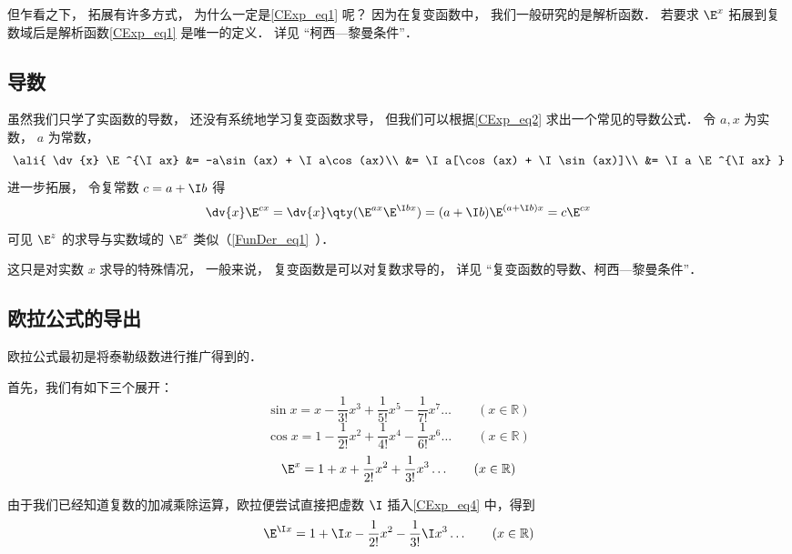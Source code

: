 但乍看之下， 拓展有许多方式， 为什么一定是\autoref{CExp_eq1} 呢？ 因为在复变函数中， 我们一般研究的是解析函数． 若要求 $\E^x$ 拓展到复数域后是解析函数\autoref{CExp_eq1} 是唯一的定义． 详见 “柯西—黎曼条件”．

\subsection{导数}
虽然我们只学了实函数的导数， 还没有系统地学习复变函数求导， 但我们可以根据\autoref{CExp_eq2} 求出一个常见的导数公式． 令 $a, x$ 为实数， $a$ 为常数，
\begin{equation}\ali{
\dv{x} \E^{\I ax} &= -a\sin(ax) + \I a\cos(ax)\\
&= \I a[\cos(ax) + \I \sin(ax)]\\
&= \I a \E^{\I ax}
}\end{equation}
进一步拓展， 令复常数 $c = a + \I b$ 得
\begin{equation}
\dv{x}\E^{c x} = \dv{x} \qty(\E^{ax}\E^{\I bx}) = (a + \I b)\E^{(a+\I b)x} = c\E^{cx}
\end{equation}
可见 $\E^z$ 的求导与实数域的 $\E^x$ 类似（\autoref{FunDer_eq1}~）．

这只是对实数 $x$ 求导的特殊情况， 一般来说， 复变函数是可以对复数求导的， 详见 “复变函数的导数、柯西—黎曼条件”．

\subsection{欧拉公式的导出}


欧拉公式最初是将泰勒级数进行推广得到的．

首先，我们有如下三个展开：
\begin{equation}\label{CExp_eq3}
\sin x = x - \frac{1}{3!} x^3 + \frac{1}{5!} x^5 - \frac{1}{7!} x^7 \ldots
\qquad (x \in \mathbb R)
\end{equation}
\begin{equation}\label{CExp_eq5}
\cos x = 1 - \frac{1}{2!} x^2 + \frac{1}{4!} x^4 -\frac{1}{6!} x^6 \ldots
\qquad (x \in \mathbb R)
\end{equation}
\begin{equation}
\E^x =1 + x + \frac{1}{2!} x^2 + \frac{1}{3!} x^3  \ldots
\qquad (x \in \mathbb R)
\end{equation}

由于我们已经知道复数的加减乘除运算，欧拉便尝试直接把虚数 $\I$ 插入\autoref{CExp_eq4}  中，得到
\begin{equation}\label{CExp_eq4}
\E^{\I x} =1 + \I x - \frac{1}{2!} x^2 - \frac{1}{3!} \I x^3  \ldots
\qquad (x \in \mathbb R)
\end{equation}

